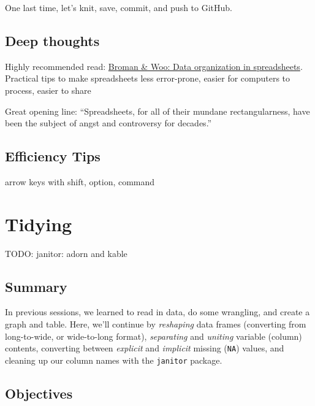 \documentclass[]{book}
\begin{document}
One last time, let's knit, save, commit, and push to GitHub.

\hypertarget{deep-thoughts-1}{%
\section{Deep thoughts}\label{deep-thoughts-1}}

Highly recommended read: \href{https://peerj.com/preprints/3183/}{Broman \& Woo: Data organization in spreadsheets}. Practical tips to make spreadsheets less error-prone, easier for computers to process, easier to share

Great opening line: ``Spreadsheets, for all of their mundane rectangularness, have been the subject of angst and controversy for decades.''

\hypertarget{efficiency-tips-3}{%
\section{Efficiency Tips}\label{efficiency-tips-3}}

arrow keys with shift, option, command

\hypertarget{tidying}{%
\chapter{Tidying}\label{tidying}}

TODO: janitor: adorn and kable

\hypertarget{summary-5}{%
\section{Summary}\label{summary-5}}

In previous sessions, we learned to read in data, do some wrangling, and create a graph and table. Here, we'll continue by \emph{reshaping} data frames (converting from long-to-wide, or wide-to-long format), \emph{separating} and \emph{uniting} variable (column) contents, converting between \emph{explicit} and \emph{implicit} missing (\texttt{NA}) values, and cleaning up our column names with the \texttt{janitor} package.

\hypertarget{objectives-5}{%
\section{Objectives}\label{objectives-5}}
\end{document}

